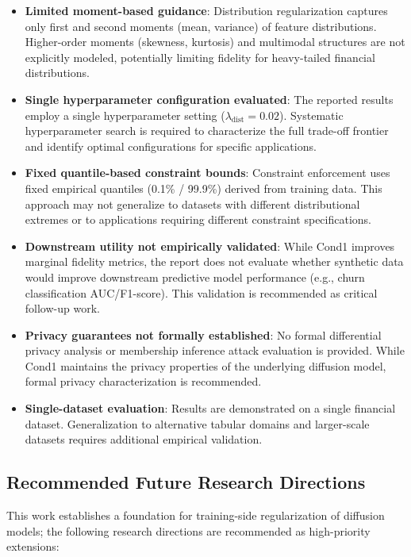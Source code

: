 \documentclass[10pt,conference,a4paper]{IEEEtran}
\begin{document}
\begin{itemize}
    \item \textbf{Limited moment-based guidance}: Distribution regularization captures only first and second moments (mean, variance) of feature distributions. Higher-order moments (skewness, kurtosis) and multimodal structures are not explicitly modeled, potentially limiting fidelity for heavy-tailed financial distributions.
    
    \item \textbf{Single hyperparameter configuration evaluated}: The reported results employ a single hyperparameter setting ($\lambda_{\text{dist}} = 0.02$). Systematic hyperparameter search is required to characterize the full trade-off frontier and identify optimal configurations for specific applications.
    
    \item \textbf{Fixed quantile-based constraint bounds}: Constraint enforcement uses fixed empirical quantiles (0.1\% / 99.9\%) derived from training data. This approach may not generalize to datasets with different distributional extremes or to applications requiring different constraint specifications.
    
    \item \textbf{Downstream utility not empirically validated}: While Cond1 improves marginal fidelity metrics, the report does not evaluate whether synthetic data would improve downstream predictive model performance (e.g., churn classification AUC/F1-score). This validation is recommended as critical follow-up work.
    
    \item \textbf{Privacy guarantees not formally established}: No formal differential privacy analysis or membership inference attack evaluation is provided. While Cond1 maintains the privacy properties of the underlying diffusion model, formal privacy characterization is recommended.
    
    \item \textbf{Single-dataset evaluation}: Results are demonstrated on a single financial dataset. Generalization to alternative tabular domains and larger-scale datasets requires additional empirical validation.
\end{itemize}

\subsection{Recommended Future Research Directions}
This work establishes a foundation for training-side regularization of diffusion models; the following research directions are recommended as high-priority extensions:
\end{document}
